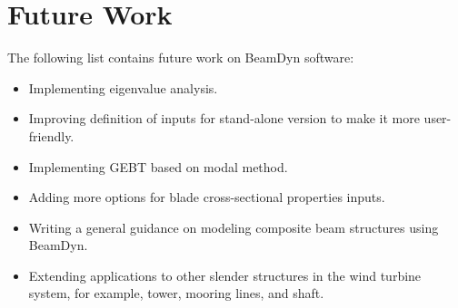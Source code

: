 \chapter{Future Work}
The following list contains future work on BeamDyn software:

\begin{itemize}
    \item Implementing eigenvalue analysis.
    \item Improving definition of inputs for stand-alone version to make it more user-friendly.
    \item Implementing GEBT based on modal method.
    \item Adding more options for blade cross-sectional properties inputs.
    \item Writing a general guidance on modeling composite beam structures using BeamDyn.
    \item Extending applications to other slender structures in the wind turbine system, for example, tower, mooring lines, and shaft.
\end{itemize}